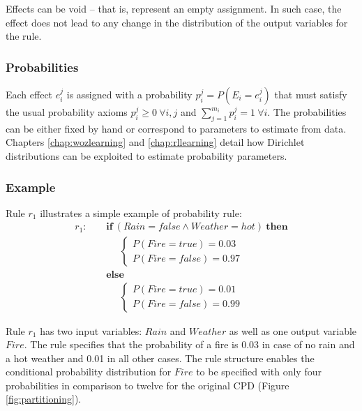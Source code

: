 Effects can be void -- that is, represent an empty assignment.  In such case, the effect does not lead to any change in the distribution of the output variables for the rule. 

\subsubsection*{Probabilities}

Each effect $e_i^j$ is assigned with a probability $p_i^j = P(E_i = e_i^j)$ that must satisfy the usual probability axioms $p_i^j \geq 0  \ \forall i,j$ and $\sum_{j = 1}^{m_i} p_i^j = 1 \ \forall i$.  The probabilities can be either fixed by hand or correspond to parameters to estimate from data.  Chapters \ref{chap:wozlearning} and \ref{chap:rllearning} detail how Dirichlet distributions can be exploited to estimate probability parameters. 


\subsubsection*{Example}

Rule $r_1$ illustrates a simple example of probability rule:
\begin{align*}
r_1: \ \ \ \ \ & \textbf{if} \ (\mathit{Rain}\!=\!\mathit{false} \land \mathit{Weather}\!=\!\mathit{hot}) \ \textbf{then} \\
& \;\;\;\;\;  \begin{cases}
 P(\mathit{Fire}\!=\!\mathit{true}) = 0.03 \\ 
P(\mathit{Fire}\!=\!\mathit{false}) = 0.97
\end{cases} \\ 
& \textbf{else} \\
& \;\;\;\;\; \begin{cases}
P(\mathit{Fire}\!=\!\mathit{true}) = 0.01 \\
P(\mathit{Fire}\!=\!\mathit{false}) = 0.99
\end{cases} 
\end{align*}

Rule $r_1$ has two input variables: $\mathit{Rain}$ and $\mathit{Weather}$ as well as one output variable $\mathit{Fire}$. The rule specifies that the probability of a fire is 0.03 in case of no rain and a hot weather and 0.01 in all other cases.  The rule structure enables the conditional probability distribution for $\mathit{Fire}$ to be specified with only four probabilities in comparison to twelve for the original CPD (Figure \ref{fig:partitioning}). 


